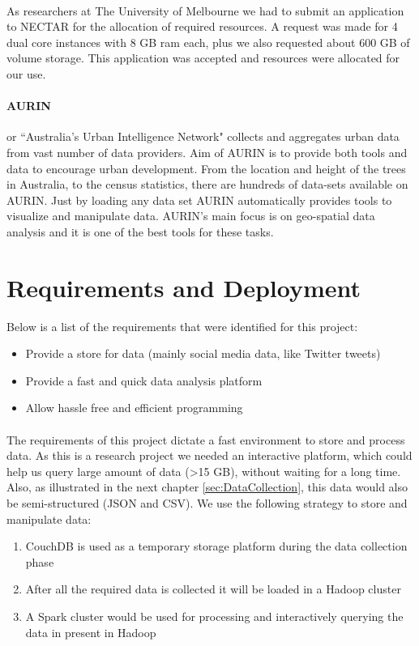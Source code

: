 \documentclass[12pt]{report}
\theoremstyle{named}
\begin{document}
\paragraph{}
As researchers at The University of Melbourne we had to submit an application to NECTAR for the allocation of required resources. A request was made for 4 dual core instances with 8 GB ram each, plus we also requested about 600 GB of volume storage. This application was accepted and resources were allocated for our use.

\paragraph{AURIN} or ``Australia’s Urban Intelligence Network" collects and aggregates urban data from vast number of data providers. Aim of AURIN is to provide both tools and data to encourage urban development. From the location and height of the trees in Australia, to the census statistics, there are hundreds of data-sets available on AURIN. Just by loading any data set AURIN automatically provides tools to visualize and manipulate data. AURIN's main focus is on geo-spatial data analysis and it is one of the best tools for these tasks.



\section{Requirements and Deployment}
Below is a list of the requirements that were identified for this project:
\begin{itemize}
  \item Provide a store for data (mainly social media data, like Twitter tweets) 
  \item Provide a fast and quick data analysis platform
  \item Allow hassle free and efficient programming
\end{itemize}

\paragraph{}
The requirements of this project dictate a fast environment to store and process data. As this is a research project we needed an interactive platform, which could help us query large amount of data (\textgreater15 GB), without waiting for a long time. Also, as illustrated in the next chapter \ref{sec:DataCollection}, this data would also be semi-structured (JSON and CSV). We use the following strategy to store and manipulate data:
\begin{enumerate}
  \item CouchDB is used as a temporary storage platform during the data collection phase
  \item After all the required data is collected it will be loaded in a Hadoop cluster
  \item A Spark cluster would be used for processing and interactively querying the data in present in Hadoop
\end{enumerate}
\end{document}
